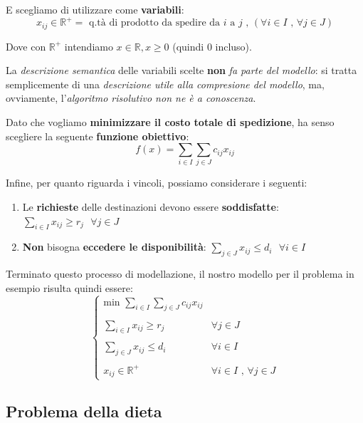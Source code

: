 E scegliamo di utilizzare come \textbf{variabili}:
\[
    x_{ij}\in \mathbb{R}^+ = \text{ q.tà di prodotto da spedire da }i \text{ a }j \text{ , }
    (\forall i\in I \text{ , }\forall j \in J)
\]

Dove con $\mathbb{R}^+$ intendiamo $x\in \mathbb{R}, x\ge 0$ (quindi 0 incluso).

\begin{remark}
    La \textit{descrizione semantica} delle variabili scelte \textbf{non}
    \textit{fa parte del modello}: si tratta semplicemente di una \textit{descrizione
    utile alla compresione del modello}, ma, ovviamente, l'\textit{algoritmo
    risolutivo non ne è a conoscenza}.
\end{remark}

Dato che vogliamo \textbf{minimizzare il costo totale di spedizione}, ha senso 
scegliere la seguente \textbf{funzione obiettivo}:
\[
    f(x) = \sum_{i\in I} \sum_{j\in J} c_{ij}x_{ij}
\]

Infine, per quanto riguarda i vincoli, possiamo considerare i seguenti:
\begin{enumerate}
    \item Le \textbf{richieste} delle destinazioni devono essere \textbf{soddisfatte}: 
        $\sum_{i\in I} x_{ij} \ge r_j \text{ } \forall j\in J$
    \item \textbf{Non} bisogna \textbf{eccedere le disponibilità}: 
        $\sum_{j\in J}x_{ij} \le d_i \text{ } \forall i\in I$
\end{enumerate}

Terminato questo processo di modellazione, il nostro modello per il problema 
in esempio risulta quindi essere:
\[
    \begin{cases}
        \text{min } \sum_{i\in I} \sum_{j\in J} c_{ij}x_{ij} \\ \\  
        \sum_{i\in I} x_{ij} \ge r_j & \forall j\in J \\ \\ 
        \sum_{j\in J}x_{ij} \le d_i & \forall i\in I \\ \\
        x_{ij} \in \mathbb{R}^+ & \forall i \in I \text{ , }\forall j\in J
    \end{cases}
\]

\subsection{Problema della dieta}

